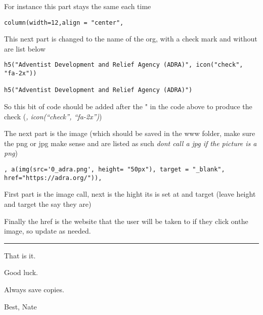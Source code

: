 \documentclass[
]{article}
\begin{document}
For instance this part stays the same each time

\begin{verbatim}
column(width=12,align = "center",
\end{verbatim}

This next part is changed to the name of the org, with a check mark and
without are list below

\begin{verbatim}
h5("Adventist Development and Relief Agency (ADRA)", icon("check", "fa-2x"))

h5("Adventist Development and Relief Agency (ADRA)")
\end{verbatim}

So this bit of code should be added after the " in the code above to
produce the check (\emph{, icon(``check'', ``fa-2x'')})

The next part is the image (which should be saved in the www folder,
make sure the png or jpg make sense and are listed as such \emph{dont
call a jpg if the picture is a png})

\begin{verbatim}
, a(img(src='0_adra.png', height= "50px"), target = "_blank", href="https://adra.org/")),
\end{verbatim}

First part is the image call, next is the hight its is set at and target
(leave height and target the say they are)

Finally the href is the website that the user will be taken to if they
click onthe image, so update as needed.

\begin{center}\rule{0.5\linewidth}{0.5pt}\end{center}

That is it.

Good luck.

Always save copies.

Best, Nate
\end{document}
